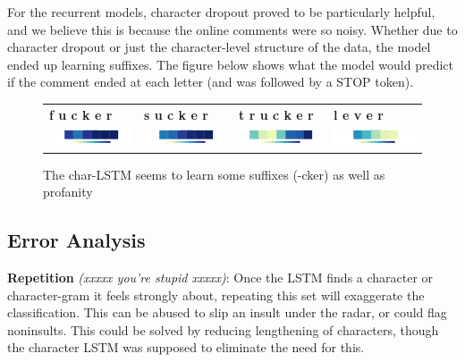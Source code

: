 \documentclass{article} %
\begin{document}
For the recurrent models, character dropout proved to be particularly helpful, and we believe this is because the online comments were so noisy. Whether due to character dropout or just the character-level structure of the data, the model ended up learning suffixes. The figure below shows what the model would predict if the comment ended at each letter (and was followed by a STOP token).
\begin{figure}[H]
\begin{tabular}{llll}
\hspace*{0.1cm} {\color{bostonuniversityred} \textbf{f  u  c  k  e  r}} & 
\hspace*{1.0cm} {\color{bostonuniversityred} \textbf{s u c k e r}} & 
\hspace*{0.9cm} {\color{bostonuniversityred} \textbf{t r u c k e r}} & 
\hspace*{1.1cm} {\color{Ao} \textbf{l e v e r}} \\

\hspace*{-1cm} 
\includegraphics[width=3.5cm, height=0.5cm]{fucker.png}
& \includegraphics[width=3.5cm, height=0.5cm]{sucker.png}
& \includegraphics[width=3.5cm, height=0.5cm]{trucker.png}
& \includegraphics[width=3.5cm, height=0.5cm]{lever.png} \\
\end{tabular}
\caption{The char-LSTM seems to learn some suffixes (-cker) as well as profanity}
\end{figure}


\subsection*{Error Analysis}
\textbf{Repetition} \textit{(xxxxx you're stupid xxxxx)}: Once the LSTM finds a character or character-gram it feels strongly about, repeating this set will exaggerate the classification. This can be abused to slip an insult under the radar, or could flag noninsults. This could be solved by reducing lengthening of characters, though the character LSTM was supposed to eliminate the need for this.
\end{document}

